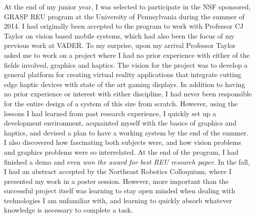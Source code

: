 \documentclass[12pt]{article}
\begin{document}
At the end of my junior year, I was selected to participate in the NSF
sponsored, GRASP REU program at the University of Pennsylvania during the
summer of 2014. I had originally been accepted to the program to work with
Professor CJ Taylor on vision based mobile systems, which had also been the focus
of my previous work at VADER. To my surprise, upon my arrival Professor Taylor
asked me to work on a project where I had no prior experience with either of
the fields involved, graphics and haptics. The vision for the project was to
develop a general platform for creating virtual reality applications that
integrate cutting edge haptic devices with state of the art gaming displays.
In addition to having no prior experience or interest with either discipline, I
had never been responsible for the entire design of a system of this size from
scratch.  However, using the lessons I had learned from past research
experience, I quickly set up a development environment, acquainted myself with
the basics of graphics and haptics, and devised a plan to have a working system
by the end of the summer. I also discovered how fascinating both subjects were,
and how vision problems and graphics problems were so interrelated. At the end
of the program, I had finished a demo and even \emph{won the award for best REU
research paper}. In the fall, I had an abstract accepted by the Northeast
Robotics Colloquium, where I presented my work in a poster session.  However,
more important than the successful project itself was learning to stay open
minded when dealing with technologies I am unfamiliar with, and learning to
quickly absorb whatever knowledge is necessary to complete a task.
\end{document}
